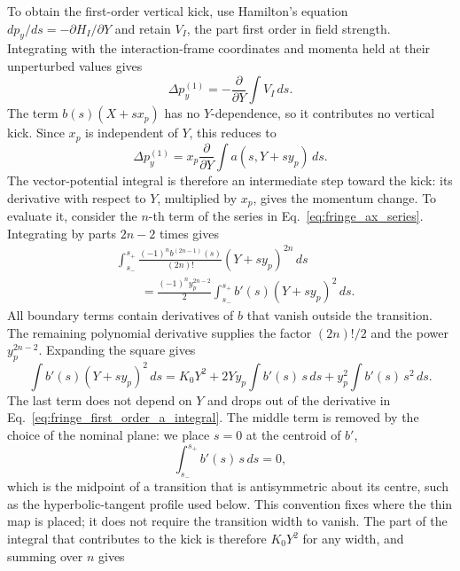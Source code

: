 To obtain the first-order vertical kick, use Hamilton's equation
$dp_y/ds=-\partial H_I/\partial Y$ and retain $V_I$, the part first order
in field strength. Integrating with the interaction-frame coordinates and
momenta held at their unperturbed values gives
\begin{equation}
 \Delta p_y^{(1)}
 =-\frac{\partial}{\partial Y}\int V_I\,ds.
 \label{eq:fringe_first_order_kick_integral}
\end{equation}
The term $b(s)(X+s x_p)$ has no $Y$-dependence, so it contributes no
vertical kick. Since $x_p$ is independent of $Y$, this reduces to
\begin{equation}
 \Delta p_y^{(1)}
 =x_p\frac{\partial}{\partial Y}
   \int a(s,Y+s y_p)\,ds.
 \label{eq:fringe_first_order_a_integral}
\end{equation}
The vector-potential integral is therefore an intermediate step toward
the kick: its derivative with respect to $Y$, multiplied by $x_p$,
gives the momentum change. To evaluate it, consider the $n$-th term of
the series in Eq.~\eqref{eq:fringe_ax_series}. Integrating by parts
$2n-2$ times gives
\begin{align}
 &\int_{s_-}^{s_+}
 \frac{(-1)^n b^{(2n-1)}(s)}{(2n)!}(Y+s y_p)^{2n}\,ds\nonumber\\
 &\qquad=\frac{(-1)^n y_p^{2n-2}}{2}
       \int_{s_-}^{s_+}b'(s)(Y+s y_p)^2\,ds.
\end{align}
All boundary terms contain derivatives of $b$ that vanish outside the
transition. The remaining polynomial derivative supplies the factor
$(2n)!/2$ and the power $y_p^{2n-2}$. Expanding the square gives
\begin{equation}
 \int b'(s)(Y+s y_p)^2\,ds
 =K_0Y^2+2Yy_p\int b'(s)\,s\,ds+y_p^2\int b'(s)\,s^2\,ds.
\end{equation}
The last term does not depend on $Y$ and drops out of the derivative in
Eq.~\eqref{eq:fringe_first_order_a_integral}. The middle term is removed by
the choice of the nominal plane: we place $s=0$ at the centroid of $b'$,
\begin{equation}
 \int_{s_-}^{s_+}b'(s)\,s\,ds=0,
 \label{eq:fringe_edge_position}
\end{equation}
which is the midpoint of a transition that is antisymmetric about its
centre, such as the hyperbolic-tangent profile used below. This convention
fixes where the thin map is placed; it does not require the transition
width to vanish. The part of the integral that contributes to the kick is
therefore $K_0Y^2$ for any width, and summing over $n$ gives
